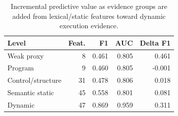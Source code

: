 \begin{table}[!htbp]
\centering
\scriptsize
\begin{tabular}{lrrrr}
\toprule
Level & Feat. & F1 & AUC & Delta F1 \\
\midrule
Weak proxy & 8 & 0.461 & 0.805 & 0.461 \\
Program & 9 & 0.460 & 0.805 & -0.001 \\
Control/structure & 31 & 0.478 & 0.806 & 0.018 \\
Semantic static & 45 & 0.558 & 0.801 & 0.081 \\
Dynamic & 47 & 0.869 & 0.959 & 0.311 \\
\bottomrule
\end{tabular}
\vspace{0.5em}
\caption{Incremental predictive value as evidence groups are added from lexical/static features toward dynamic execution evidence.}
\label{tab:evidence-hierarchy}
\end{table}
